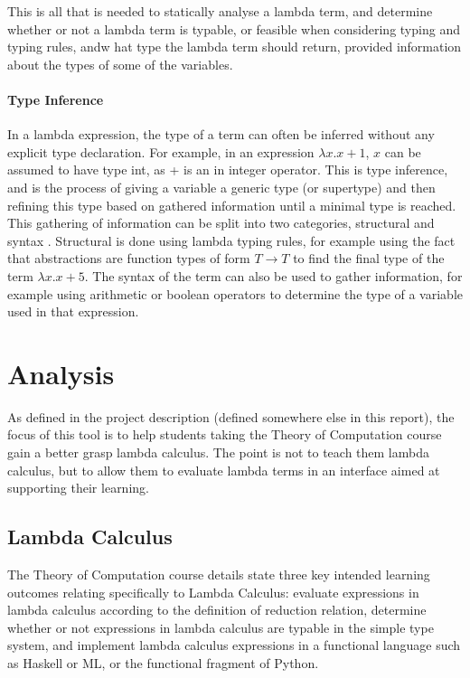 \documentclass[a4paper,12pt]{report}
\begin{document}
This is all that is needed to statically analyse a lambda term, and determine whether or not a lambda term is typable, or feasible when considering typing and typing rules, andw hat type the lambda term should return, provided information about the types of some of the variables.

\subsubsection{Type Inference}
In a lambda expression, the type of a term can often be inferred without any explicit type declaration. For example, in an expression $\lambda x.x+1$, $x$ can be assumed to have type int, as + is an in integer operator. This is type inference, and is the process of giving a variable a generic type (or supertype) and then refining this type based on gathered information until a minimal type is reached. \cite{Gay2019} \cite{Bezem2008} \cite{Wiesner2011}\\

This gathering of information can be split into two categories, structural and syntax \cite{Bezem2008}. Structural is done using lambda typing rules, for example using the fact that abstractions are function types of form $T \rightarrow T$ to find the final type of the term $\lambda x.x+5$. The syntax of the term can also be used to gather information, for example using arithmetic or boolean operators to determine the type of a variable used in that expression.

\chapter{Analysis}
As defined in the project description (defined somewhere else in this report), the focus of this tool is to help students taking the Theory of Computation course gain a better grasp lambda calculus. The point is not to teach them lambda calculus, but to allow them to evaluate lambda terms in an interface aimed at supporting their learning.

\section{Lambda Calculus}
The Theory of Computation course details \cite{CourseSpecification} state three key intended learning outcomes relating specifically to Lambda Calculus: evaluate expressions in lambda calculus according to the definition of reduction relation, determine whether or not expressions in lambda calculus are typable in the simple type system, and implement lambda calculus expressions in a functional language such as Haskell or ML, or the functional fragment of Python.
\end{document}
